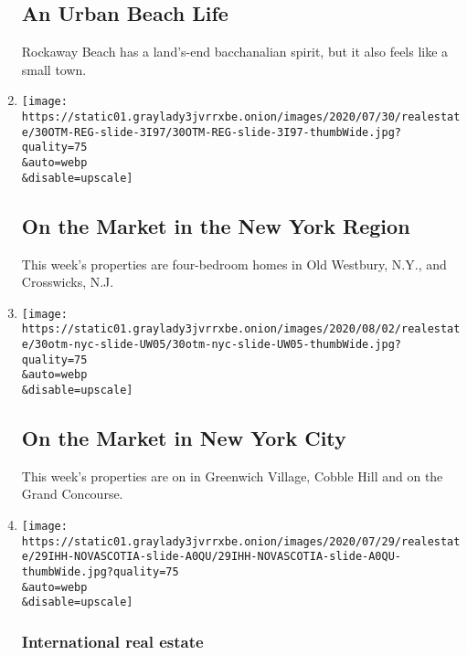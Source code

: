 \begin{enumerate}
  \hypertarget{an-urban-beach-life}{%
  \subsection{An Urban Beach Life}\label{an-urban-beach-life}}

  Rockaway Beach has a land's-end bacchanalian spirit, but it also feels
  like a small town.
\item
  \href{/slideshow/2020/07/30/realestate/on-the-market-in-the-new-york-region.html}{}

  \texttt{[image: https://static01.graylady3jvrrxbe.onion/images/2020/07/30/realestate/30OTM-REG-slide-3I97/30OTM-REG-slide-3I97-thumbWide.jpg?quality=75\\\&auto=webp\\\&disable=upscale]}

  \hypertarget{on-the-market-in-the-new-york-region}{%
  \subsection{On the Market in the New York
  Region}\label{on-the-market-in-the-new-york-region}}

  This week's properties are four-bedroom homes in Old Westbury, N.Y.,
  and Crosswicks, N.J.
\item
  \href{/slideshow/2020/07/30/realestate/on-the-market-in-new-york-city.html}{}

  \texttt{[image: https://static01.graylady3jvrrxbe.onion/images/2020/08/02/realestate/30otm-nyc-slide-UW05/30otm-nyc-slide-UW05-thumbWide.jpg?quality=75\\\&auto=webp\\\&disable=upscale]}

  \hypertarget{on-the-market-in-new-york-city}{%
  \subsection{On the Market in New York
  City}\label{on-the-market-in-new-york-city}}

  This week's properties are on in Greenwich Village, Cobble Hill and on
  the Grand Concourse.
\item
  \href{/2020/07/29/realestate/house-hunting-in-nova-scotia-a-sprawling-seaside-villa-for-2-million.html}{}

  \texttt{[image: https://static01.graylady3jvrrxbe.onion/images/2020/07/29/realestate/29IHH-NOVASCOTIA-slide-A0QU/29IHH-NOVASCOTIA-slide-A0QU-thumbWide.jpg?quality=75\\\&auto=webp\\\&disable=upscale]}

  \hypertarget{international-real-estate}{%
  \subsubsection{International real
  estate}\label{international-real-estate}}


\end{enumerate}

